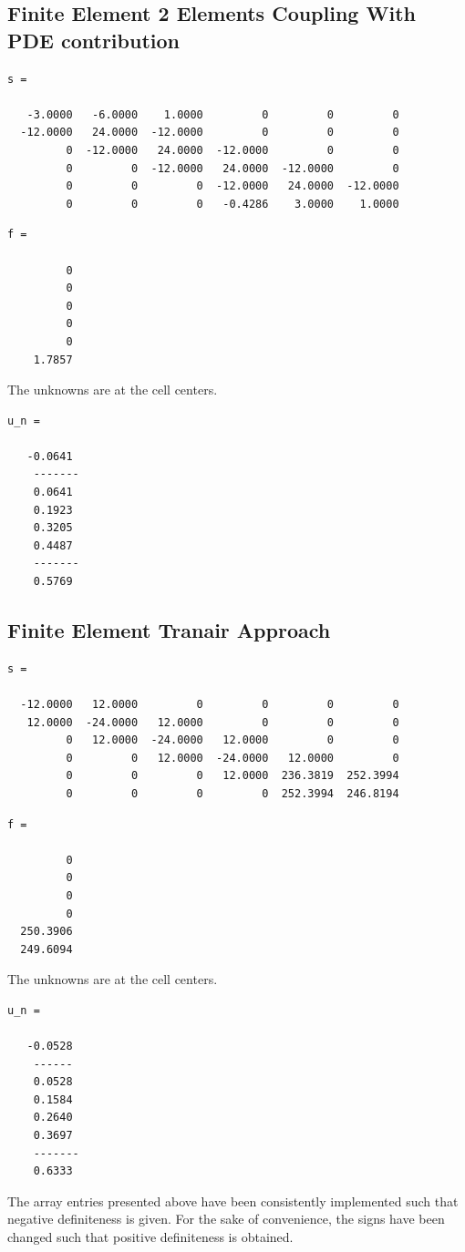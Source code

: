 \documentclass[a4paper,12pt]{article}
\begin{document}
\subsection{Finite Element 2 Elements Coupling With PDE contribution}
\begin{verbatim}
s =

   -3.0000   -6.0000    1.0000         0         0         0
  -12.0000   24.0000  -12.0000         0         0         0
         0  -12.0000   24.0000  -12.0000         0         0
         0         0  -12.0000   24.0000  -12.0000         0
         0         0         0  -12.0000   24.0000  -12.0000
         0         0         0   -0.4286    3.0000    1.0000
\end{verbatim}
\begin{verbatim}
f =

         0
         0
         0
         0
         0
    1.7857
\end{verbatim}
The unknowns are at the cell centers.
\begin{verbatim}
u_n =

   -0.0641
    -------
    0.0641
    0.1923
    0.3205
    0.4487
    -------
    0.5769
\end{verbatim}
\subsection{Finite Element Tranair Approach}
\begin{verbatim}
s =

  -12.0000   12.0000         0         0         0         0
   12.0000  -24.0000   12.0000         0         0         0
         0   12.0000  -24.0000   12.0000         0         0
         0         0   12.0000  -24.0000   12.0000         0
         0         0         0   12.0000  236.3819  252.3994
         0         0         0         0  252.3994  246.8194

\end{verbatim}
\begin{verbatim}
f =

         0
         0
         0
         0
  250.3906
  249.6094
\end{verbatim}
The unknowns are at the cell centers.
\begin{verbatim}
u_n =

   -0.0528
    ------
    0.0528
    0.1584
    0.2640
    0.3697
    -------
    0.6333
\end{verbatim}
The array entries presented above have been consistently implemented such that negative definiteness is given. For the sake of convenience, the signs have been changed such that positive definiteness is obtained. 
\end{document}

